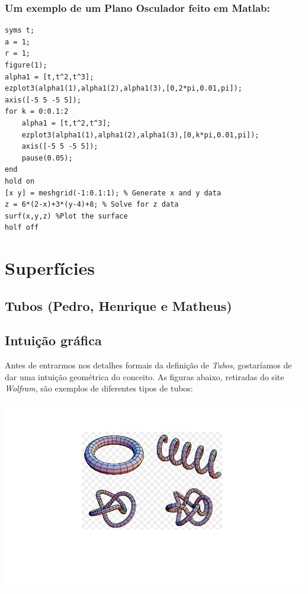 \documentclass[a4paper]{article}
\begin{document}
\subsubsection*{Um exemplo de um Plano Osculador feito em Matlab:}

\begin{lstlisting}[frame=single]
syms t;
a = 1;
r = 1;
figure(1);
alpha1 = [t,t^2,t^3];
ezplot3(alpha1(1),alpha1(2),alpha1(3),[0,2*pi,0.01,pi]);
axis([-5 5 -5 5]);
for k = 0:0.1:2
    alpha1 = [t,t^2,t^3];
    ezplot3(alpha1(1),alpha1(2),alpha1(3),[0,k*pi,0.01,pi]);
    axis([-5 5 -5 5]);
    pause(0.05);
end
hold on 
[x y] = meshgrid(-1:0.1:1); % Generate x and y data
z = 6*(2-x)+3*(y-4)+8; % Solve for z data
surf(x,y,z) %Plot the surface
holf off
\end{lstlisting}


\section{Superfícies}

\subsection{Tubos (Pedro, Henrique e Matheus)}

\subsection*{Intuição gráfica}

Antes de entrarmos nos detalhes formais da definição de \textit{Tubos}, gostaríamos de dar uma intuição geométrica do conceito. As figuras abaixo, retiradas do site \textit{Wolfram}, são exemplos de diferentes tipos de tubos:

\includegraphics[width=\textwidth]{tubes.jpg}
\end{document}
